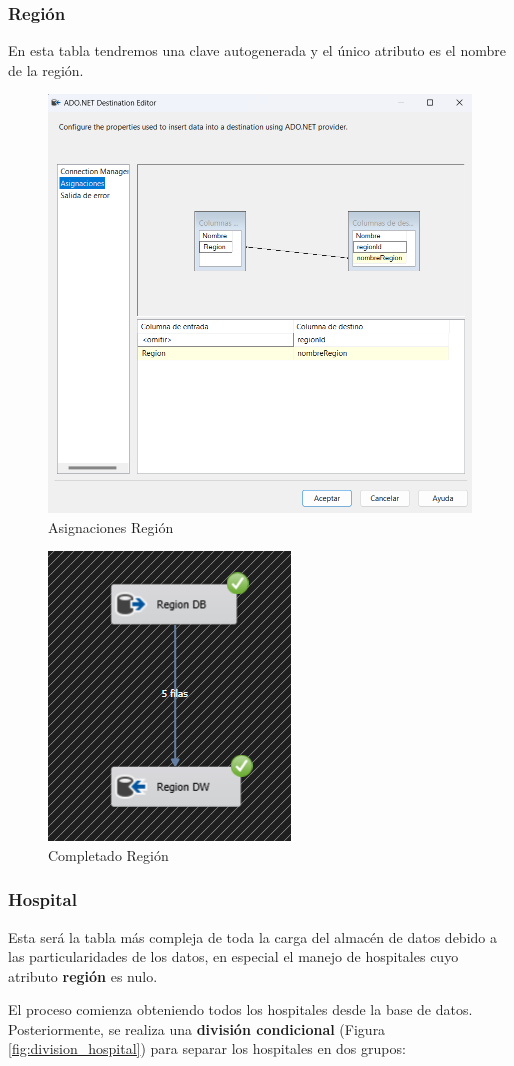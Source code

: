 \documentclass{article}
\begin{document}
	\subsubsection{Región}
	En esta tabla tendremos una clave autogenerada y el único atributo es el nombre de la región.
	\begin{figure}[H]
		\centering
		\includegraphics[width=.7\linewidth]{./images/asignaciones/region.png}
		\caption{Asignaciones Región}
	\end{figure}
	\begin{figure}[H]
		\centering
		\includegraphics[width=.3\linewidth]{./images/completados/region.png}
		\caption{Completado Región}
	\end{figure}
	\subsubsection{Hospital}
	Esta será la tabla más compleja de toda la carga del almacén de datos debido a las particularidades de los datos, en especial el manejo de hospitales cuyo atributo \textbf{región} es nulo.
	
	El proceso comienza obteniendo todos los hospitales desde la base de datos. Posteriormente, se realiza una \textbf{división condicional} (Figura \ref{fig:division_hospital}) para separar los hospitales en dos grupos: 
	
\end{document}

